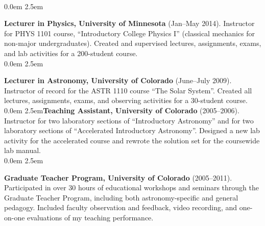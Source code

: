 \medskip
\medskip
{}\\[4pt]
\parindent 0.0em
\hangindent2.5em{\large {\bf{\sc Lecturer in Physics}, University of Minnesota} (Jan--May 2014). Instructor for PHYS 1101 course, ``Introductory College Physics I'' (classical mechanics for non-major undergraduates). Created and supervised lectures, assignments, exams, and lab activities for a 200-student course.\\[4pt]

\parindent 0.0em
\hangindent2.5em{\large {\bf{\sc Lecturer in Astronomy}, University of Colorado} (June--July 2009). Instructor of record for the ASTR 1110 course ``The Solar System''. Created all lectures, assignments, exams, and observing activities for a 30-student course.\\[4pt]

%
\parindent 0.0em
\hangindent2.5em{\large {\bf{\sc Teaching Assistant}, University of Colorado} (2005--2006)}. Instructor for two laboratory sections of ``Introductory Astronomy'' and for two laboratory sections of ``Accelerated Introductory Astronomy''. Designed a new lab activity for the accelerated course and rewrote the solution set for the coursewide lab manual. \\[4pt]

\parindent 0.0em
\hangindent2.5em{\large {\bf{\sc Graduate Teacher Program}, University of Colorado} (2005--2011). Participated in over 30 hours of educational workshops and seminars through the Graduate Teacher Program, including both astronomy-specific and general pedagogy. Included faculty observation and feedback, video recording, and one-on-one evaluations of my teaching performance. \\[4pt]


\pagestyle{fancy}
\renewcommand{\headrulewidth}{1pt} %
\parindent0pt

}}}
